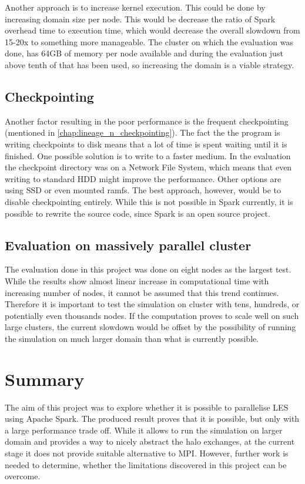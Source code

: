 \documentclass{l4proj}
\begin{document}
Another approach is to increase kernel execution. This could be done by increasing
domain size per node. This would be decrease the ratio of Spark overhead time to 
execution time, which would decrease the overall slowdown from 15-20x to 
something more manageable. The cluster on which the evaluation was done, has 64GB
of memory per node available and during the evaluation just above tenth of that
has been used, so increasing the domain is a viable strategy.

\subsection{Checkpointing}

Another factor resulting in the poor performance is the frequent checkpointing
(mentioned in \autoref{chap:lineage_n_checkpointing}). The fact the the program
is writing checkpoints to disk means that a lot of time is spent waiting until
it is finished. One possible solution is to write to a faster medium. In the evaluation
the checkpoint directory was on a Network File System, which means that even 
writing to standard HDD might improve the performance. Other options are using SSD
or even mounted ramfs. The best approach, however, would be to disable checkpointing
entirely. While this is not possible in Spark currently, it is possible to rewrite 
the source code, since Spark is an open source project.

\subsection{Evaluation on massively parallel cluster}

The evaluation done in this project was done on eight nodes as the largest test.
While the results show almost linear increase in computational time with
increasing number of nodes, it cannot be assumed that this trend continues.
Therefore it is important to test the simulation on cluster with tens, hundreds,
or potentially even thousands nodes. If the computation proves to scale well
on such large clusters, the current slowdown would be offset by the 
possibility of running the simulation on much larger domain than what is
currently possible.

\section{Summary}

The aim of this project was to explore whether it is possible to parallelise 
LES using Apache Spark. The produced result proves that it is possible, but only 
with a large performance trade off. While it allows to run the simulation on larger
domain and provides a way to nicely abstract the halo exchanges, at the current stage
it does not provide suitable alternative to MPI. However, further work is needed
to determine, whether the limitations discovered in this project can be overcome.
\end{document}
